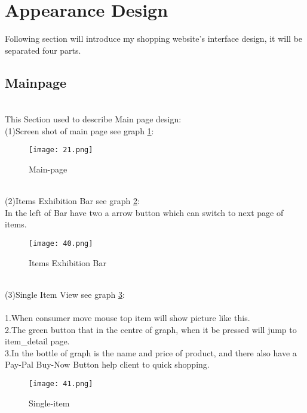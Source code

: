 \section{Appearance Design }
Following section will introduce my shopping website's interface design, it will be separated four parts. 
\subsection{Mainpage}
\\
This Section used to describe Main page design:\\
(1)Screen shot of main page see graph \ref{fig:18 cubed graph}: 
\\
\begin{figure}[h]
	\centering
	\texttt{[image: 21.png]}
	\caption{Main-page}
	\label{fig:18 cubed graph}
\end{figure}	
\\
(2)Items Exhibition Bar see graph \ref{fig:19 cubed graph}: 
\\
In the left of Bar have two a arrow button which can switch to next page of items.\\
\begin{figure}[h]
	\centering
	\texttt{[image: 40.png]}
	\caption{Items Exhibition Bar }
	\label{fig:19 cubed graph}
\end{figure}	
\\
(3)Single Item View see graph \ref{fig:20 cubed graph}: 
\\
\\
1.When consumer move mouse top item will show picture like this.\\
2.The green button that in the centre of graph, when it be pressed will jump to item\_detail page.\\
3.In the bottle of graph is the name and price of product, and there also have a 
Pay-Pal Buy-Now Button help client to quick shopping.\\
\begin{figure}[h]
	\centering
	\texttt{[image: 41.png]}
	\caption{Single-item}
	\label{fig:20 cubed graph}
\end{figure}	
\\
